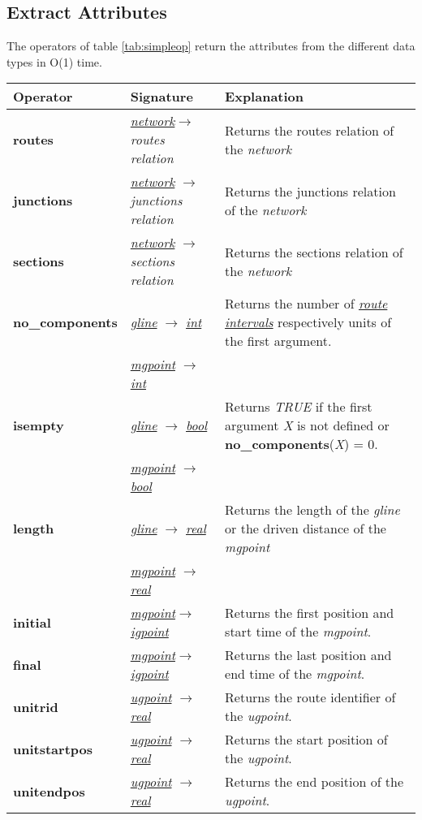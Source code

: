 \documentclass[a4paper]{article}
\newcommand{\op}[1]{\textbf{#1}}
\newcommand{\var}[1]{\textsl{#1}}
\newcommand{\dt}[1]{\textsl{\underline{#1}}}
\newcommand{\true}{\var{TRUE}}
\begin{document}
\subsection{Extract Attributes}
\label{sec:lengthgline}
The operators of table \ref{tab:simpleop} return the attributes from the different data types in O(1) time.
\begin{table}[H]
\begin{scriptsize}
\begin{tabular}{|l|l|p{10cm}|}
\hline
\textbf{Operator}&\textbf{Signature}&\textbf{Explanation}\\
\hline
\op{routes}&\dt{network}$ \rightarrow$ \var{routes relation}& Returns the routes relation of the \var{network}\\
\hline
\op{junctions}&\dt{network} $\rightarrow$  \var{junctions relation}& Returns the junctions relation of the \var{network}\\
\hline
\op{sections}&\dt{network} $\rightarrow$ \var{sections relation}& Returns the sections relation of the \var{network}\\
\hline
\op{no\_components}&\dt{gline} $\rightarrow$ \dt{int}& Returns the number of \dt{route intervals} respectively units of the first argument.\\
&\dt{mgpoint} $\rightarrow$ \dt{int}& \\
\hline
\op{isempty}&\dt{gline} $\rightarrow$ \dt{bool}& Returns \true{} if the first argument \var{X} is not defined or \op{no\_components}(\var{X}) = 0.\\
&\dt{mgpoint} $\rightarrow$ \dt{bool}&  \\
\hline
\op{length}&\dt{gline} $\rightarrow$ \dt{real}& Returns the length of the \var{gline} or the driven distance of the \var{mgpoint}\\
&\dt{mgpoint} $\rightarrow$ \dt{real} & \\
\hline
\op{initial}&\dt{mgpoint}$\rightarrow$\dt{igpoint}& Returns the first position and start time of the \var{mgpoint}.\\
\hline
\op{final}&\dt{mgpoint}$\rightarrow$\dt{igpoint}& Returns the last position and end time of the \var{mgpoint}.\\
\hline
\op{unitrid}&\dt{ugpoint} $\rightarrow$ \dt{real}& Returns the route identifier of the \var{ugpoint}.\\
\hline
\op{unitstartpos}&\dt{ugpoint} $\rightarrow$ \dt{real} & Returns the start position of the \var{ugpoint}.\\
\hline
\op{unitendpos}&\dt{ugpoint} $\rightarrow$ \dt{real}& Returns the end position of the \var{ugpoint}.\\

\end{tabular}
\end{scriptsize}
\end{table}
\end{document}
